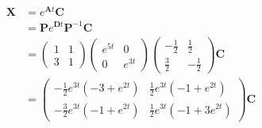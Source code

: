\documentclass{article}
\begin{document}
\setcounter{subsubsection}{24}
\subsubsection{}

\begin{align*}
  \mathbf{X} & = e^{\mathbf{A} t} \mathbf{C}                                                \\
             & = \mathbf{P} e^{\mathbf{D} t} \mathbf{P}^{-1} \mathbf{C}                     \\
             & = \begin{pmatrix}
                   1 & 1 \\
                   3 & 1
                 \end{pmatrix} \begin{pmatrix}
                                 e^{5 t} & 0       \\
                                 0       & e^{3 t}
                               \end{pmatrix} \begin{pmatrix}
                                               -\frac{1}{2} & \frac{1}{2}  \\
                                               \frac{3}{2}  & -\frac{1}{2}
                                             \end{pmatrix} \mathbf{C}                    \\
             & = \begin{pmatrix}
                   -\frac{1}{2} e^{3 t} (-3 + e^{2 t}) & \frac{1}{2} e^{3 t} (-1 + e^{2 t})   \\
                   -\frac{3}{2} e^{3 t} (-1 + e^{2 t}) & \frac{1}{2} e^{3 t} (-1 + 3 e^{2 t})
                 \end{pmatrix} \mathbf{C}
\end{align*}
\end{document}
